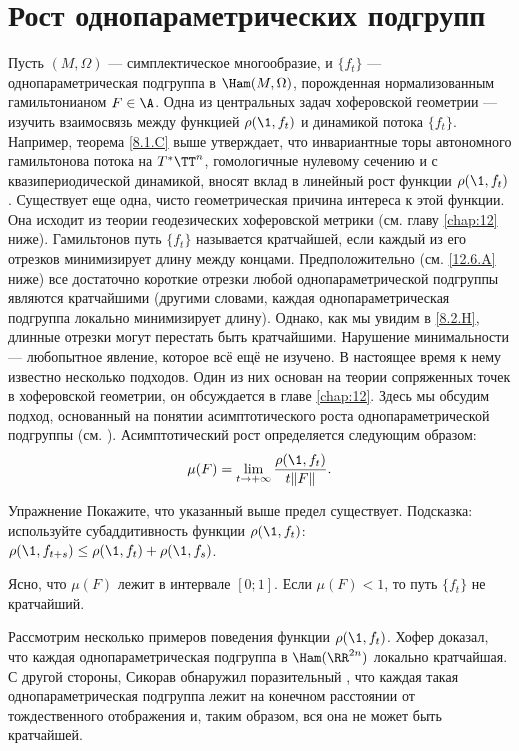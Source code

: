\section{Рост однопараметрических подгрупп}
Пусть $(M, \Omega)$ --- симплектическое многообразие, и $\{f_t\}$ --- однопараметрическая подгруппа в $\Ham (M, \Omega)$, порожденная нормализованным гамильтонианом $F \in \A$.
Одна из центральных задач хоферовской геометрии --- изучить взаимосвязь между функцией $\rho (\1, f_t)$ и динамикой потока $\{f_t\}$.
Например, теорема \ref{8.1.C} выше утверждает, что инвариантные торы автономного гамильтонова потока на $T^\ast \TT^n$,  гомологичные нулевому сечению и с квазипериодической динамикой, вносят вклад в линейный рост функции $\rho (\1, f_t)$.
Существует еще одна, чисто геометрическая причина интереса к этой функции.
Она исходит из теории геодезических хоферовской метрики (см. главу \ref{chap:12} ниже).
Гамильтонов путь $\{f_t\}$ называется кратчайшей, если каждый из его отрезков минимизирует длину между  концами.
Предположительно (см. \ref{12.6.A} ниже) все достаточно короткие отрезки любой однопараметрической подгруппы являются кратчайшими (другими словами, каждая однопараметрическая подгруппа локально минимизирует длину).
Однако, как мы увидим в \ref{8.2.H}, длинные отрезки могут перестать быть кратчайшими.
Нарушение минимальности --- любопытное явление, которое всё ещё не изучено.
В настоящее время к нему известно несколько подходов.
Один из них основан на теории сопряженных точек в хоферовской геометрии, он обсуждается в главе \ref{chap:12}.
Здесь мы обсудим подход, основанный на понятии асимптотического роста однопараметрической подгруппы (см. \cite{BP2}).
Асимптотический рост определяется следующим образом:
\[\mu(F)=\lim_{t \to + \infty}\frac{\rho (\1, f_t)}{ t \| F \|}.\]

\begin{thm*}{Упражнение}
Покажите, что указанный выше предел существует.
Подсказка: используйте субаддитивность функции $\rho (\1, f_t)$: $\rho (\1, f_{t + s}) \le \rho (\1, f_t) + \rho (\1, f_s)$.
\end{thm*}

Ясно, что $\mu (F)$ лежит в интервале $[0; 1]$.
Если $\mu (F) <1$, то путь $\{f_t\}$ не кратчайший.

Рассмотрим несколько примеров поведения функции $\rho (\1, f_t)$.
Хофер \cite{H2} доказал, что каждая однопараметрическая подгруппа в $\Ham (\RR^{2n})$ локально кратчайшая.
С другой стороны, Сикорав \cite{S2} обнаружил поразительный , что каждая такая однопараметрическая подгруппа лежит на конечном расстоянии от тождественного отображения и, таким образом, вся она не может быть кратчайшей.

